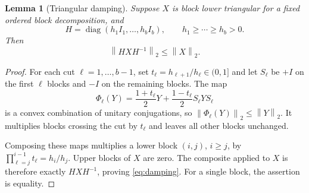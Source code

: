 \documentclass[11pt]{article}
\newtheorem{lemma}[theorem]{Lemma}
\theoremstyle{remark}\newtheorem{remark}[theorem]{Remark}
\newcommand{\norm}[1]{\left\lVert #1\right\rVert_2}
\newcommand{\diag}{\operatorname{diag}}
\begin{document}
\begin{lemma}[Triangular damping]\label{lem:damping}
Suppose $X$ is block lower triangular for a fixed ordered block decomposition, and
\[
 H=\diag(h_1I_1,\ldots,h_bI_b),\qquad
 h_1\geq\cdots\geq h_b>0.
\]
Then
\begin{equation}\label{eq:damping}
 \norm{HXH^{-1}}\leq\norm X.
\end{equation}
\end{lemma}
\begin{proof}
For each cut $\ell=1,\ldots,b-1$, set $t_\ell=h_{\ell+1}/h_\ell\in(0,1]$ and let $S_\ell$ be $+I$ on the first $\ell$ blocks and $-I$ on the remaining blocks. The map
\[
 \Phi_\ell(Y)=\frac{1+t_\ell}{2}Y
              +\frac{1-t_\ell}{2}S_\ell YS_\ell
\]
is a convex combination of unitary conjugations, so $\norm{\Phi_\ell(Y)}\leq\norm Y$. It multiplies blocks crossing the cut by $t_\ell$ and leaves all other blocks unchanged.

Composing these maps multiplies a lower block $(i,j)$, $i\geq j$, by
$\prod_{\ell=j}^{i-1}t_\ell=h_i/h_j$. Upper blocks of $X$ are zero. The composite applied to $X$ is therefore exactly $HXH^{-1}$, proving \eqref{eq:damping}. For a single block, the assertion is equality.
\end{proof}
\end{document}
